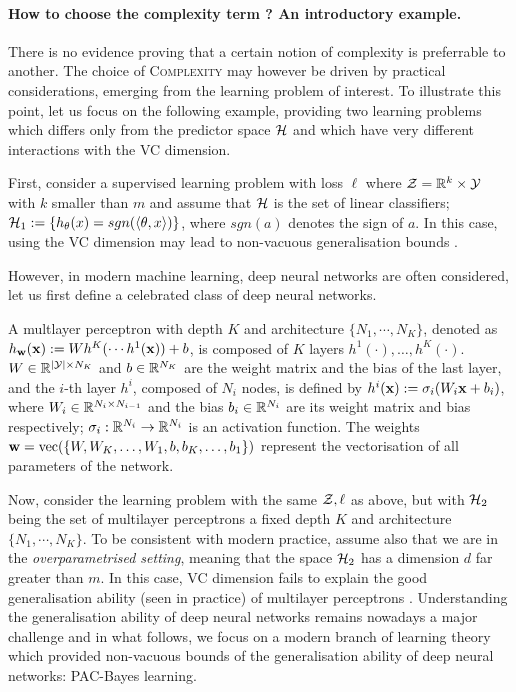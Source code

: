 \paragraph{How to choose the complexity term ? An introductory example.} There is no evidence proving that a certain notion of complexity is preferrable to another. The choice of \textsc{Complexity} may however be driven by practical considerations, emerging from the learning problem of interest. To illustrate this point, let us focus on the following example, providing two learning problems which differs only from the predictor space $\mathcal{H}$ and which have very different interactions with the VC dimension.

First, consider a supervised learning problem with loss $\ell$ where $\mathcal{Z} = \mathbb{R}^k\times\mathcal{Y}$ with $k$ smaller than $m$ and assume that $\mathcal{H}$ is the set of linear classifiers; \ie $\mathcal{H}_1:= \left\{ h_{\theta}(x)= sgn(\langle \theta,x\rangle)  \right\}$, where $sgn(a)$ denotes the sign of $a$. In this case, using the VC dimension may lead to non-vacuous generalisation bounds \citep{vapnik2000learning}. 

However, in modern machine learning, deep neural networks are often considered, let us first define a celebrated class of deep neural networks. 

\begin{definition}
    A multlayer perceptron with depth $K$ and architecture $\{N_1,\cdots,N_K\}$, denoted as $h_{\mathbf{w}}(\mathbf{x}) := Wh^{K}(\cdots h^{1}(\mathbf{x}))+b$, is composed of $K$ layers $h^1(\cdot),\dots,h^K(\cdot)$.
 $W\in\mathbb{R}^{|\mathcal{Y}|\times N_K}$ and $b\in\mathbb{R}^{N_K}$ are the weight matrix and the bias of the last layer, and the $i$-th layer $h^{i}$, composed of $N_i$ nodes, is defined by $h^{i}(\mathbf{x}):=\sigma_i(W_i \mathbf{x} + b_i)$, where $W_i\in\mathbb{R}^{N_i\times N_{i-1}}$ and the bias $b_i\in \mathbb{R}^{N_i}$ are its weight matrix and bias respectively; $\sigma_i : \mathbb{R}^{N_i} \to \mathbb{R}^{N_i} $ is an activation function.
The weights $\mathbf{w}=\operatorname*{\mathrm{vec}}(\{W, W_{K}, \dots, W_1, b, b_{K}, \dots, b_1\})$ represent the vectorisation of all parameters of the network.
\end{definition}
Now, consider the learning problem with the same $\mathcal{Z},\ell$ as above, but with $\mathcal{H}_2$ being the set of multilayer perceptrons \wrt a fixed depth $K$ and architecture $\{N_1,\cdots,N_K\}$. To be consistent with modern practice, assume also that we are in the \emph{overparametrised setting}, meaning that the space $\mathcal{H}_2$ has a dimension $d$ far greater than $m$.
In this case, VC dimension fails to explain the good generalisation ability (seen in practice) of multilayer perceptrons \citep{bartlett2003vapnik}.
Understanding the generalisation ability of deep neural networks remains nowadays a major challenge and in what follows, we focus on a modern branch of learning theory which provided non-vacuous bounds of the generalisation ability of deep neural networks: PAC-Bayes learning.

